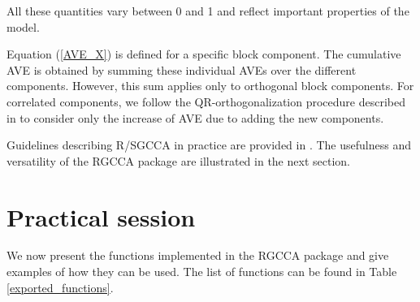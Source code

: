 \documentclass[
]{jss}
\begin{document}
All these quantities vary between 0 and 1 and reflect important
properties of the model.

Equation (\ref{AVE_X}) is defined for a specific block component. The
cumulative AVE is obtained by summing these individual AVEs over the
different components. However, this sum applies only to orthogonal block
components. For correlated components, we follow the
QR-orthogonalization procedure described in \cite{Zou2006} to consider
only the increase of AVE due to adding the new components.

Guidelines describing R/SGCCA in practice are provided in
\cite{Garali2018}. The usefulness and versatility of the RGCCA package
are illustrated in the next section.

\hypertarget{practical-session}{%
\section{Practical session}\label{practical-session}}

We now present the functions implemented in the RGCCA package and give
examples of how they can be used. The list of functions can be found in
Table \ref{exported_functions}.
\end{document}
